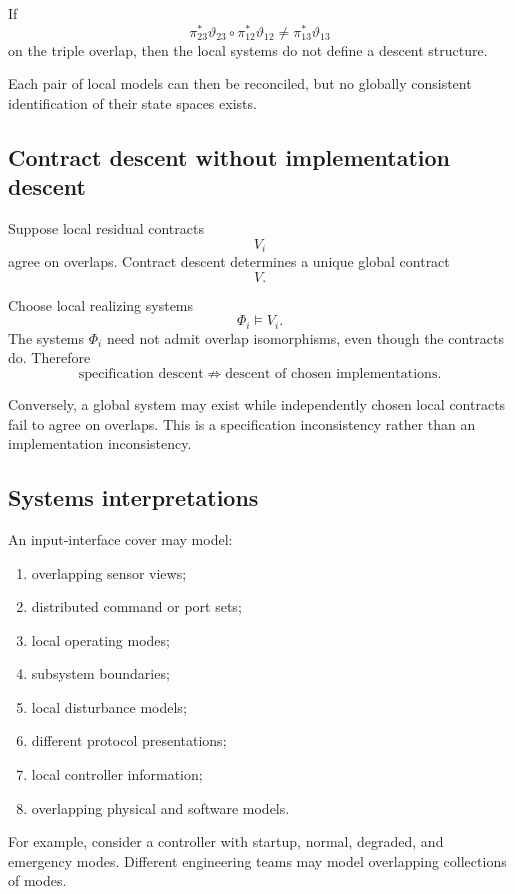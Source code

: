 If
\[
    \pi_{23}^\ast\vartheta_{23}
    \circ
    \pi_{12}^\ast\vartheta_{12}
    \neq
    \pi_{13}^\ast\vartheta_{13}
\]
on the triple overlap, then the local systems do not define a descent
structure.

Each pair of local models can then be reconciled, but no globally consistent
identification of their state spaces exists.

\subsection{Contract descent without implementation descent}
\label{subsec:example-contract-without-implementation-descent}

Suppose local residual contracts
\[
    V_i
\]
agree on overlaps. Contract descent determines a unique global contract
\[
    V.
\]

Choose local realizing systems
\[
    \Phi_i\models V_i.
\]
The systems \(\Phi_i\) need not admit overlap isomorphisms, even though the
contracts do. Therefore
\[
    \text{specification descent}
    \not\Rightarrow
    \text{descent of chosen implementations}.
\]

Conversely, a global system may exist while independently chosen local
contracts fail to agree on overlaps. This is a specification inconsistency
rather than an implementation inconsistency.

\subsection{Systems interpretations}
\label{subsec:systems-interpretations-interface-descent}

An input-interface cover may model:
\begin{enumerate}
    \item overlapping sensor views;
    \item distributed command or port sets;
    \item local operating modes;
    \item subsystem boundaries;
    \item local disturbance models;
    \item different protocol presentations;
    \item local controller information;
    \item overlapping physical and software models.
\end{enumerate}

For example, consider a controller with startup, normal, degraded, and
emergency modes. Different engineering teams may model overlapping
collections of modes.

